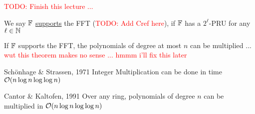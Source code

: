 \begin{lemma}{}{}
    
\end{lemma}

\textcolor{red}{TODO: Finish this lecture ... }

\begin{definition}{}{}
    We say $\operatorname{\mathbb{F}}$ \ul{supports} the FFT (\textcolor{red}{TODO: Add Cref here}), if $\operatorname{\mathbb{F}}$ has a $2^\ell$-PRU for any $\ell \in \operatorname{\mathbb{N}}$
\end{definition}

\begin{theorem}{}{}
    If $\operatorname{\mathbb{F}}$ supports the FFT, the polynomials of degree at most $n$ can be multiplied ... \textcolor{red}{wut this theorem makes no sense ... hmmm i'll fix this later}
\end{theorem}

\begin{theorem}{Sch\"{o}nhage \& Strassen, 1971}{}
    Integer Multiplication can be done in time $\operatorname{\mathcal{O}}(n\log n \log\log n)$ 
\end{theorem}

\begin{theorem}{Cantor \& Kaltofen, 1991}{}
    Over any ring, polynomials of degree $n$ can be multiplied in $\operatorname{\mathcal{O}}(n \log n \log\log n)$
\end{theorem}
